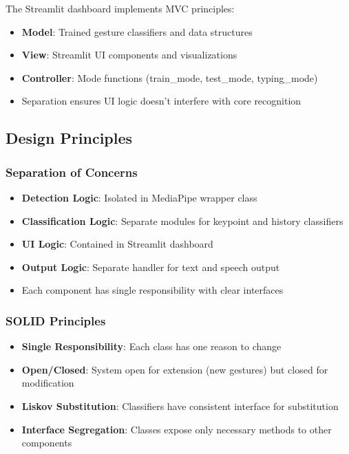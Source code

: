 The Streamlit dashboard implements MVC principles:
\begin{itemize}
    \item \textbf{Model}: Trained gesture classifiers and data structures
    \item \textbf{View}: Streamlit UI components and visualizations
    \item \textbf{Controller}: Mode functions (train\_mode, test\_mode, typing\_mode)
    \item Separation ensures UI logic doesn't interfere with core recognition
\end{itemize}

\subsection{Design Principles}

\subsubsection{Separation of Concerns}

\begin{itemize}
    \item \textbf{Detection Logic}: Isolated in MediaPipe wrapper class
    \item \textbf{Classification Logic}: Separate modules for keypoint and history classifiers
    \item \textbf{UI Logic}: Contained in Streamlit dashboard
    \item \textbf{Output Logic}: Separate handler for text and speech output
    \item Each component has single responsibility with clear interfaces
\end{itemize}

\subsubsection{SOLID Principles}

\begin{itemize}
    \item \textbf{Single Responsibility}: Each class has one reason to change
    \item \textbf{Open/Closed}: System open for extension (new gestures) but closed for modification
    \item \textbf{Liskov Substitution}: Classifiers have consistent interface for substitution
    \item \textbf{Interface Segregation}: Classes expose only necessary methods to other components
\end{itemize}

